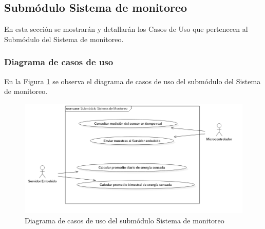 \subsection{Submódulo Sistema de monitoreo}
En esta sección se mostrarán y detallarán los Casos de Uso que pertenecen al Submódulo del Sistema de monitoreo.
\subsubsection{Diagrama de casos de uso}
En la Figura \ref{fig:dcu-moduloMonitoreo} se observa el diagrama de casos de uso del submódulo del Sistema de monitoreo.
\begin{figure}[H]
	\centering
	\includegraphics[scale=.6]{Capitulo4/software/submodulos/mediciones/images/dcuSubMonitoreo.png}
	\caption{Diagrama de casos de uso del submódulo Sistema de monitoreo}
	\label{fig:dcu-moduloMonitoreo}
\end{figure}





